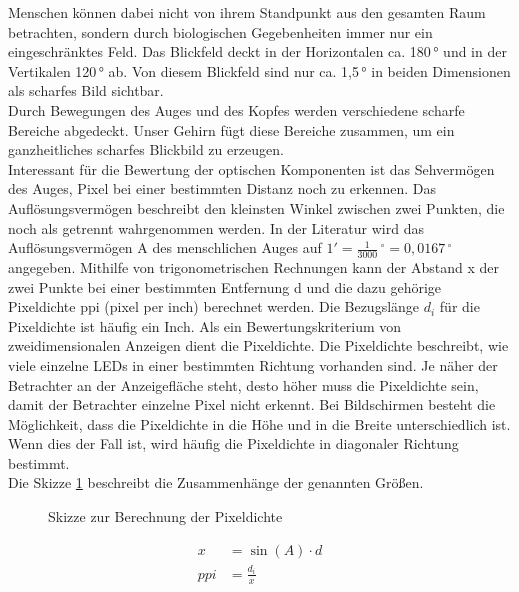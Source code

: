 Menschen können dabei nicht von ihrem Standpunkt aus den gesamten Raum betrachten, sondern durch biologischen Gegebenheiten immer nur ein eingeschränktes Feld. Das Blickfeld deckt in der Horizontalen ca. 180\,° und in der Vertikalen 120\,° ab. Von diesem Blickfeld sind nur ca. 1,5\,° in beiden Dimensionen als scharfes Bild sichtbar. \\
Durch Bewegungen des Auges und des Kopfes werden verschiedene scharfe Bereiche abgedeckt. Unser Gehirn fügt diese Bereiche zusammen, um ein ganzheitliches scharfes Blickbild zu erzeugen. \cite[Vgl. Seite 14]{Buhler.2017} \\
Interessant für die Bewertung der optischen Komponenten ist das Sehvermögen des Auges, Pixel bei einer bestimmten Distanz noch zu erkennen. Das Auflösungsvermögen beschreibt den kleinsten Winkel zwischen zwei Punkten, die noch als getrennt wahrgenommen werden. In der Literatur wird das Auflösungsvermögen A des menschlichen Auges auf $ 1' = \frac{1}{3000}\,^\circ = 0,0167\,^\circ $ angegeben. Mithilfe von trigonometrischen Rechnungen kann der Abstand x der zwei Punkte bei einer bestimmten Entfernung d und die dazu gehörige Pixeldichte ppi (pixel per inch) berechnet werden. Die Bezugslänge $ d_{i} $ für die Pixeldichte ist häufig ein Inch. \cite[Vgl. Seite 209 f.]{LofflerMang.2020} 
Als ein Bewertungskriterium von zweidimensionalen Anzeigen dient die Pixeldichte. Die Pixeldichte beschreibt, wie viele einzelne LEDs in einer bestimmten Richtung vorhanden sind. Je näher der Betrachter an der Anzeigefläche steht, desto höher muss die Pixeldichte sein, damit der Betrachter einzelne Pixel nicht erkennt. Bei Bildschirmen besteht die Möglichkeit, dass die Pixeldichte in die Höhe und in die Breite unterschiedlich ist. Wenn dies der Fall ist, wird häufig die Pixeldichte in diagonaler Richtung bestimmt. \\
Die Skizze \ref{fig:Rechnung} beschreibt die Zusammenhänge der genannten Größen. \\
\begin{figure}[hbt]
	\centering
	
	\caption[Skizze zur Berechnung der Pixeldichte]{Skizze zur Berechnung der Pixeldichte}
	\label{fig:Rechnung}
\end{figure}
\begin{align}
	x &= \sin (A) \cdot d \\
	ppi &= \frac{d_{i}}{x}
\end{align}

